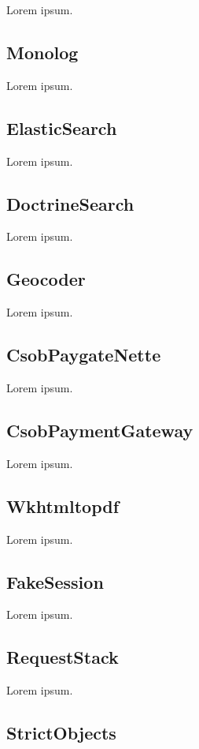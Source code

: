 Lorem ipsum.

\subsection{Monolog}

Lorem ipsum.

\subsection{ElasticSearch}

Lorem ipsum.

\subsection{DoctrineSearch}

Lorem ipsum.

\subsection{Geocoder}

Lorem ipsum.

\subsection{CsobPaygateNette}

Lorem ipsum.

\subsection{CsobPaymentGateway}

Lorem ipsum.

\subsection{Wkhtmltopdf}

Lorem ipsum.

\subsection{FakeSession}

Lorem ipsum.

\subsection{RequestStack}

Lorem ipsum.

\subsection{StrictObjects}

